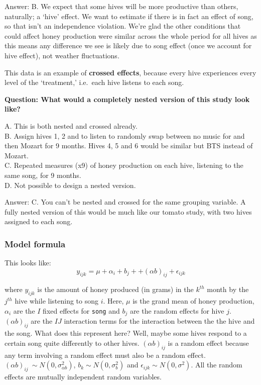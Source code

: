 \documentclass[
  openany]{book}
\begin{document}
Answer: B. We expect that some hives will be more productive than others, naturally; a `hive' effect. We want to estimate if there is in fact an effect of song, so that isn't an independence violation. We're glad the other conditions that could affect honey production were similar across the whole period for all hives as this means any difference we see is likely due to song effect (once we account for hive effect), not weather fluctuations.

This data is an example of \textbf{crossed effects}, because every hive experiences every level of the `treatment,' i.e.~each hive listens to each song.

\textbf{Question: What would a completely nested version of this study look like?}

A. This is both nested and crossed already.\\
B. Assign hives 1, 2 and to listen to randomly swap between no music for and then Mozart for 9 months. Hives 4, 5 and 6 would be similar but BTS instead of Mozart.\\
C. Repeated measures (x9) of honey production on each hive, listening to the same song, for 9 months.\\
D. Not possible to design a nested version.

Answer: C. You can't be nested and crossed for the same grouping variable. A fully nested version of this would be much like our tomato study, with two hives assigned to each song.

\hypertarget{model-formula-1}{%
\subsubsection{Model formula}\label{model-formula-1}}

This looks like:
\[ y_{ijk} = \mu + \alpha_i + b_{j} + + (\alpha b)_{ij} + \epsilon_{ijk}\]

where \(y_{ijk}\) is the amount of honey produced (in grams) in the \(k^{th}\) month by the \(j^{th}\) hive while listening to song \(i\). Here, \(\mu\) is the grand mean of honey production, \(\alpha_i\) are the \(I\) fixed effects for \texttt{song} and \(b_j\) are the random effects for hive \(j\). \((\alpha b)_{ij}\) are the \(IJ\) interaction terms for the interaction between the the hive and the song. What does this represent here? Well, maybe some hives respond to a certain song quite differently to other hives. \((\alpha b)_{ij}\) is a random effect because any term involving a random effect must also be a random effect. \((\alpha b)_{ij} ~ \sim N(0, \sigma^2_{\alpha b})\), \(b_k \sim N(0, \sigma_b^2)\) and \(\epsilon_{ijk} \sim N(0, \sigma^2)\). All the random effects are mutually independent random variables.
\end{document}
